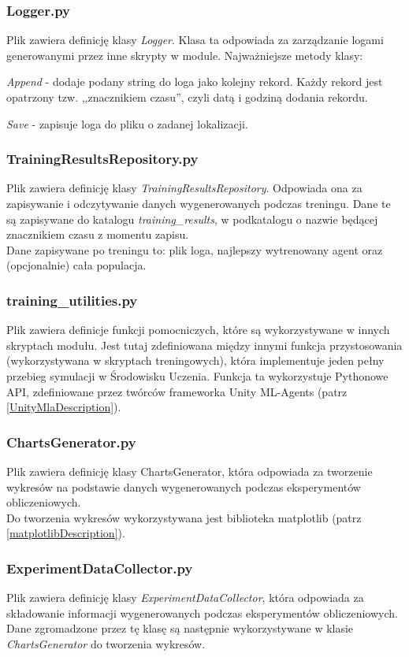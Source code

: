 \subsubsection{Logger.py}
Plik zawiera definicję klasy \textit{Logger}. Klasa ta odpowiada za zarządzanie logami generowanymi przez inne skrypty w module. Najważniejsze metody klasy:
\begin{enumerate*}
\item \textit{Append} - dodaje podany string do loga jako kolejny rekord. Każdy rekord jest opatrzony tzw. ,,znacznikiem czasu'', czyli datą i godziną dodania rekordu.
\item \textit{Save} - zapisuje loga do pliku o zadanej lokalizacji.
\end{enumerate*}

\subsubsection{TrainingResultsRepository.py}
Plik zawiera definicję klasy \textit{TrainingResultsRepository}. Odpowiada ona za zapisywanie i odczytywanie danych wygenerowanych podczas treningu. Dane te są zapisywane do katalogu \textit{training\_results}, w podkatalogu o nazwie będącej znacznikiem czasu z momentu zapisu. \\
Dane zapisywane po treningu to: plik loga, najlepszy wytrenowany agent oraz (opcjonalnie) cała populacja.

\subsubsection{training\_utilities.py}
Plik zawiera definicje funkcji pomocniczych, które są wykorzystywane w innych skryptach modułu. Jest tutaj zdefiniowana między innymi funkcja przystosowania (wykorzystywana w skryptach treningowych), która implementuje jeden pełny przebieg symulacji w Środowisku Uczenia. Funkcja ta wykorzystuje Pythonowe API, zdefiniowane przez twórców frameworka Unity ML-Agents (patrz \ref{UnityMlaDescription}).

\subsubsection{ChartsGenerator.py}
Plik zawiera definicję klasy ChartsGenerator, która odpowiada za tworzenie wykresów na \hfill podstawie \hfill danych \hfill wygenerowanych \hfill podczas \hfill eksperymentów \hfill obliczeniowych. \\
Do tworzenia wykresów wykorzystywana jest biblioteka matplotlib (patrz \ref{matplotlibDescription}).

\subsubsection{ExperimentDataCollector.py}
Plik zawiera definicję klasy \textit{ExperimentDataCollector}, która odpowiada za składowanie informacji wygenerowanych podczas eksperymentów obliczeniowych. Dane zgromadzone przez tę klasę są następnie wykorzystywane w klasie \textit{ChartsGenerator} do tworzenia wykresów.